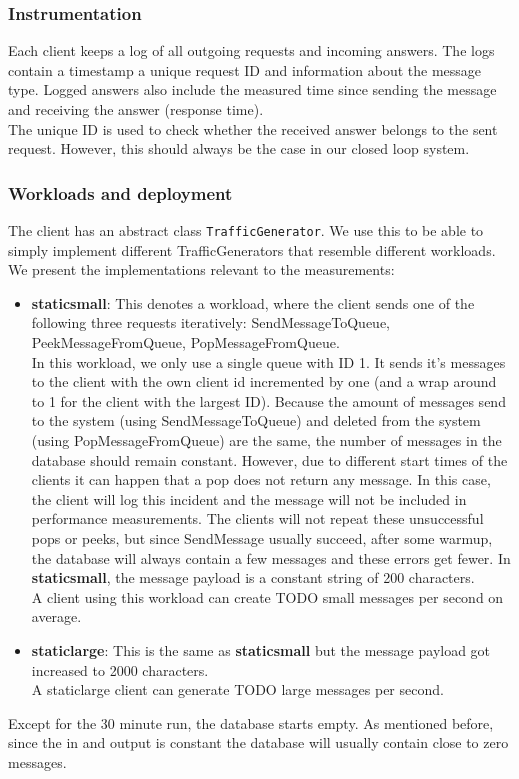 \documentclass[11pt]{article}
\begin{document}
\subsubsection{Instrumentation}\label{sec:instrumentation}
Each client keeps a log of all outgoing requests and incoming answers.
The logs contain a timestamp a unique request ID and information about the message type. Logged answers also include the measured time since sending the message and receiving the answer (response time).\\
The unique ID is used to check whether the received answer belongs to the sent request. However, this should always be the case in our closed loop system.
\subsubsection{Workloads and deployment}\label{sec:workloads-and-deployment}
The client has an abstract class \texttt{TrafficGenerator}. We use this to be able to simply implement different TrafficGenerators that resemble different workloads. We present the implementations relevant to the measurements:
\begin{itemize}
  \item \textbf{staticsmall}: This denotes a workload, where the client sends one of the following three requests iteratively: SendMessageToQueue, PeekMessageFromQueue, PopMessageFromQueue.\\
  In this workload, we only use a single queue with ID 1.
  It sends it's messages to the client with the own client id incremented by one (and a wrap around to 1 for the client with the largest ID).
  Because the amount of messages send to the system (using SendMessageToQueue) and deleted from the system (using PopMessageFromQueue) are the same, the number of messages in the database should remain constant.
  However, due to different start times of the clients it can happen that a pop does not return any message. In this case, the client will log this incident and the message will not be included in performance measurements. The clients will not repeat these unsuccessful pops or peeks, but since SendMessage usually succeed, after some warmup, the database will always contain a few messages and these errors get fewer.
  In \textbf{staticsmall}, the message payload is a constant string of 200 characters.\\
  A client using this workload can create TODO small messages per second on average.
  \item \textbf{staticlarge}: This is the same as \textbf{staticsmall} but the message payload got increased to 2000 characters.\\
  A staticlarge client can generate  TODO large messages per second.
\end{itemize}
Except for the 30 minute run, the database starts empty. As mentioned before, since the in and output is constant the database will usually contain close to zero messages.
\end{document}
